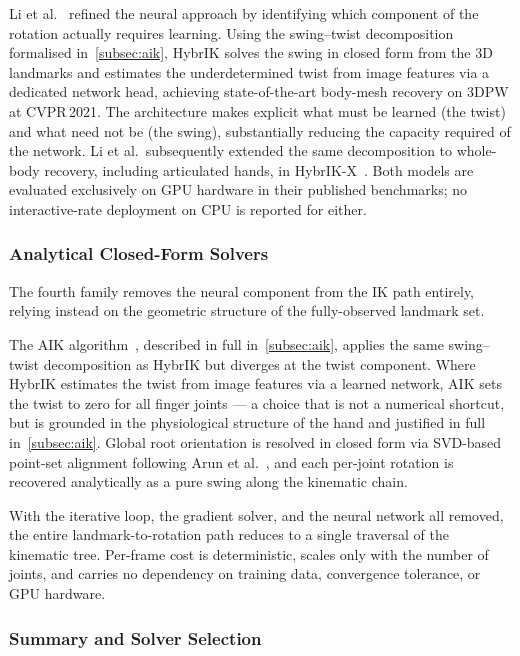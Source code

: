 Li et al.~\cite{li2022hybrik} refined the neural approach by
identifying which component of the rotation actually requires learning.
Using the swing--twist decomposition formalised in~\autoref{subsec:aik},
HybrIK solves the swing in closed form from the 3D landmarks and
estimates the underdetermined twist from image features via a
dedicated network head, achieving state-of-the-art body-mesh recovery on
3DPW at CVPR\,2021.
The architecture makes explicit what must be learned (the twist) and
what need not be (the swing), substantially reducing the capacity
required of the network.
Li et al.\ subsequently extended the same decomposition to whole-body
recovery, including articulated hands, in
HybrIK-X~\cite{li2023hybrikx}.
Both models are evaluated exclusively on GPU hardware in their published
benchmarks; no interactive-rate deployment on CPU is reported for either.



\subsubsection{Analytical Closed-Form Solvers}\label{subsubsec:sota_ik_analytical}

The fourth family removes the neural component from the IK path
entirely, relying instead on the geometric structure of the
fully-observed landmark set.

The AIK algorithm~\cite{meng2021aik}, described in full in~\autoref{subsec:aik}, applies
the same swing--twist decomposition as HybrIK but diverges at the
twist component.
Where HybrIK estimates the twist from image features via a learned
network, AIK sets the twist to zero for all finger joints --- a choice
that is not a numerical shortcut, but is grounded in the physiological
structure of the hand and justified in full in~\autoref{subsec:aik}.
Global root orientation is resolved in closed form via SVD-based
point-set alignment following Arun et al.~\cite{arun1987leastsquares},
and each per-joint rotation is recovered analytically as a pure swing
along the kinematic chain.

With the iterative loop, the gradient solver, and the neural network
all removed, the entire landmark-to-rotation path reduces to a single
traversal of the kinematic tree.
Per-frame cost is deterministic, scales only with the number of joints,
and carries no dependency on training data, convergence tolerance, or
GPU hardware.



\subsubsection{Summary and Solver Selection}\label{subsubsec:sota_ik_summary}

